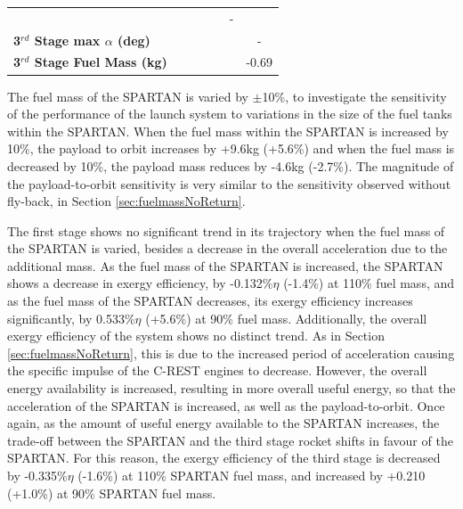 \begin{table}[ht]
\begin{tabular}{l c c c c c c}
	& \thirdqOverFivemFuelNinetyFive
	& \thirdqOverFivemFuelStandard
	& \thirdqOverFivemFuelOneHundredFive
	& \thirdqOverFivemFuelOneHundredTen
	& -
	\\
	\textbf{3$^{rd}$ Stage max $\alpha$ (deg)}
	& \thirdmaxAoAmFuelNinety
	& \thirdmaxAoAmFuelNinetyFive
	& \thirdmaxAoAmFuelStandard
	& \thirdmaxAoAmFuelOneHundredFive
	& \thirdmaxAoAmFuelOneHundredTen
	& -
	\\
	\textbf{3$^{rd}$ Stage Fuel Mass (kg)}
	& \thirdmFuelmFuelNinety
	& \thirdmFuelmFuelNinetyFive
	& \thirdmFuelmFuelStandard
	& \thirdmFuelmFuelOneHundredFive
	& \thirdmFuelmFuelOneHundredTen
	&-0.69
	\\
	\hline 
\end{tabular} 
\end{table}
	
The fuel mass of the SPARTAN is varied by $\pm$10\%, to investigate the sensitivity of the performance of the launch system to variations in the size of the fuel tanks within the SPARTAN. 
When the fuel mass within the SPARTAN is increased by 10\%, the payload to orbit increases by +9.6kg (+5.6\%) and when the fuel mass is decreased by 10\%, the payload mass reduces by -4.6kg (-2.7\%). The magnitude of the payload-to-orbit sensitivity is very similar to the sensitivity observed without fly-back, in Section \ref{sec:fuelmassNoReturn}. 

The first stage shows no significant trend in its trajectory when the fuel mass of the SPARTAN is varied, besides a decrease in the overall acceleration due to the additional mass. 
As the fuel mass of the SPARTAN is increased, the SPARTAN shows a decrease in exergy efficiency, by -0.132\%$\eta$ (-1.4\%) at 110\% fuel mass, and as the fuel mass of the SPARTAN decreases, its exergy efficiency increases significantly, by 0.533\%$\eta$ (+5.6\%) at 90\% fuel mass. Additionally, the overall exergy efficiency of the system shows no distinct trend. 
As in Section \ref{sec:fuelmassNoReturn}, this is due to the increased period of acceleration causing the specific impulse of the C-REST engines to decrease. However, the overall energy availability is increased, resulting in more overall useful energy, so that the acceleration of the SPARTAN is increased, as well as the payload-to-orbit.
Once again, as the amount of useful energy available to the SPARTAN increases, the trade-off between the SPARTAN and the third stage rocket shifts in favour of the SPARTAN. For this reason, the exergy efficiency of the third stage is decreased by -0.335\%$\eta$ (-1.6\%) at 110\% SPARTAN fuel mass, and increased by +0.210 (+1.0\%) at 90\% SPARTAN fuel mass. 




